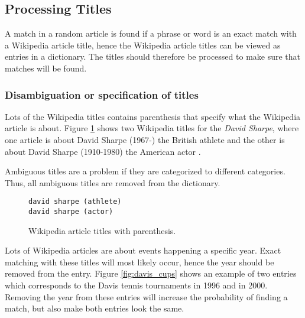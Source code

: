 \subsection{Processing Titles}
\label{sec:processingtitles}
A match in a random article is found if a phrase or word is an exact match with a Wikipedia article title, hence the Wikipedia article titles can be viewed as entries in a dictionary. The titles should therefore be processed to make sure that matches will be found. 

\subsubsection{Disambiguation or specification of titles}
Lots of the Wikipedia titles contains parenthesis that specify what the Wikipedia article is about. Figure \ref{fig:parenthesis_example} shows two Wikipedia titles for the \emph{David Sharpe}, where one article is about David Sharpe (1967-) the British athlete\cite{wiki:davidsharpeathlete} and the other is about David Sharpe (1910-1980) the American actor \cite{wiki:davidsharpeactor}.

Ambiguous titles are a problem if they are categorized to different categories. Thus, all ambiguous titles are removed from the dictionary. 




\begin{figure}[h]
\centering
\begin{lstlisting}
david sharpe (athlete)
david sharpe (actor)
\end{lstlisting}
\caption{Wikipedia article titles with parenthesis.}
\label{fig:parenthesis_example}
\end{figure}



Lots of Wikipedia articles are about events happening a specific year. Exact matching with these titles will most likely occur, hence the year should be removed from the entry.  Figure \ref{fig:davis_cups} shows an example of two entries which corresponds to the Davis tennis tournaments in 1996 and in 2000. Removing the year from these entries will increase the probability of finding a match, but also make both entries look the same. 

